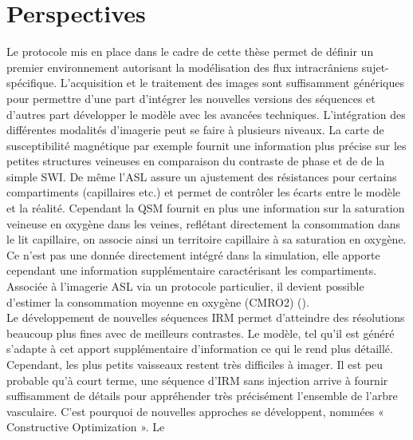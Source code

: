 
\chapter{Perspectives}
	\minitoc


Le protocole mis en place dans le cadre de cette thèse permet de définir un premier
environnement autorisant la modélisation des flux intracrâniens sujet-spécifique. L’acquisition et le
traitement des images sont suffisamment génériques pour permettre d’une part d’intégrer les
nouvelles versions des séquences et d’autres part développer le modèle avec les avancées techniques.
L’intégration des différentes modalités d’imagerie peut se faire à plusieurs niveaux. La carte de
susceptibilité magnétique par exemple fournit une information plus précise sur les petites structures
veineuses en comparaison du contraste de phase et de de la simple SWI. De même l’ASL assure un
ajustement des résistances pour certains compartiments (capillaires etc.) et permet de contrôler les
écarts entre le modèle et la réalité. Cependant la QSM fournit en plus une information sur la saturation
veineuse en oxygène dans les veines, reflétant directement la consommation dans le lit capillaire, on
associe ainsi un territoire capillaire à sa saturation en oxygène. Ce n’est pas une donnée directement
intégré dans la simulation, elle apporte cependant une information supplémentaire caractérisant les
compartiments. Associée à l’imagerie ASL via un protocole particulier, il devient possible d’estimer la
consommation moyenne en oxygène (CMRO2) (\cite{Zhang2014}).\\
Le développement de nouvelles séquences IRM permet d’atteindre des résolutions beaucoup
plus fines avec de meilleurs contrastes. Le modèle, tel qu’il est généré s’adapte à cet apport
supplémentaire d’information ce qui le rend plus détaillé. Cependant, les plus petits vaisseaux restent
très difficiles à imager. Il est peu probable qu’à court terme, une séquence d’IRM sans injection arrive
à fournir suffisamment de détails pour appréhender très précisément l’ensemble de l’arbre vasculaire.
C’est pourquoi de nouvelles approches se développent, nommées « Constructive Optimization ». Le
